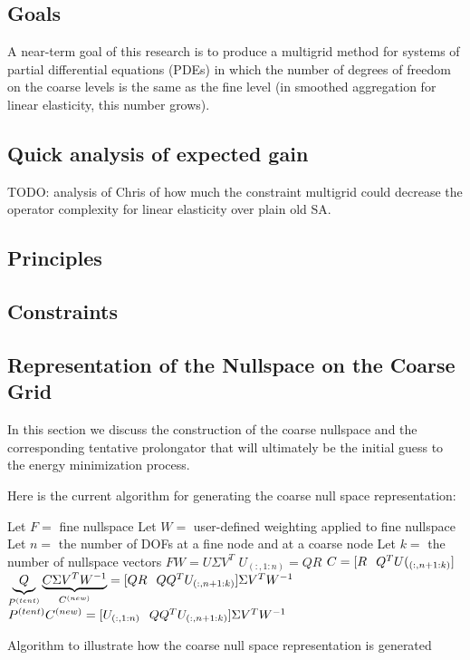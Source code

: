 \newcommand{\ConstraintsM}{\mathcal{B}}  
\newcommand{\Cnull}{C}
\newcommand{\Fnull}{F}  
\newcommand{\nulldim}{nulldim}
\newcommand{\Pbar}{\bar{P}}
\newcommand{\Fnullbar}{\bar{\Fnull}}

\subsection{Goals}

A near-term goal of this research is to produce a multigrid method for
systems of partial differential equations (PDEs) in which the number of degrees of freedom on the coarse levels is the same as the fine
level (in smoothed aggregation for linear elasticity, this number grows).

\subsection{Quick analysis of expected gain}
TODO: analysis of Chris of how much the constraint multigrid could decrease the operator complexity for linear elasticity
over plain old SA.

\subsection{Principles}
\subsection{Constraints}

\newpage
\subsection{Representation of the Nullspace on the Coarse Grid}
In this section we discuss the construction of the coarse nullspace and the corresponding tentative prolongator that will
ultimately be the initial guess to the energy minimization process.

Here is the current algorithm for generating the coarse null space representation:

\begin{algorithm}[Hhtbp]
  \SetAlgoLined %
  Let $F=$ fine nullspace\;
  Let $W=$ user-defined weighting applied to fine nullspace\;
  Let $n=$ the number of DOFs at a fine node and at a coarse node\;
  Let $k=$ the number of nullspace vectors\;
  $FW = U\Sigma V^{T}$ 
  $U_{(:,1:n)} = QR$ 
  $C = [R\hskip 0.1in   Q^{T} U(_{(:,n+1:k)}]$\;
  $\underbrace{Q}_{P^{(tent)}}\underbrace{C\Sigma V^{T}W^{-1}}_{C^{(new)}} = [QR\hskip 0.1in QQ^{T}U_{(:,n+1:k)}]\Sigma V^{T} W^{-1}$\;
  $P^{(tent)}C^{(new)} = [U_{(:,1:n)}\hskip 0.1in QQ^{T}U_{(:,n+1:k)}]\Sigma V^{T} W^{-1}$\;
  \caption{Algorithm to illustrate how the coarse null space representation is generated}
\end{algorithm}


